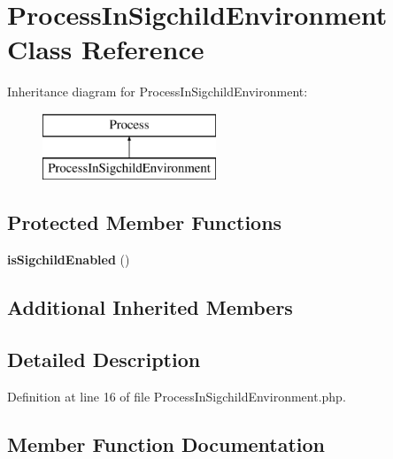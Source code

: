 \section{Process\+In\+Sigchild\+Environment Class Reference}
\label{class_symfony_1_1_component_1_1_process_1_1_tests_1_1_process_in_sigchild_environment}
Inheritance diagram for Process\+In\+Sigchild\+Environment\+:\begin{figure}[H]
\begin{center}
\leavevmode
\includegraphics[height=2.000000cm]{class_symfony_1_1_component_1_1_process_1_1_tests_1_1_process_in_sigchild_environment}
\end{center}
\end{figure}
\subsection*{Protected Member Functions}
\begin{DoxyCompactItemize}
\item 
{\bf is\+Sigchild\+Enabled} ()
\end{DoxyCompactItemize}
\subsection*{Additional Inherited Members}


\subsection{Detailed Description}


Definition at line 16 of file Process\+In\+Sigchild\+Environment.\+php.



\subsection{Member Function Documentation}
